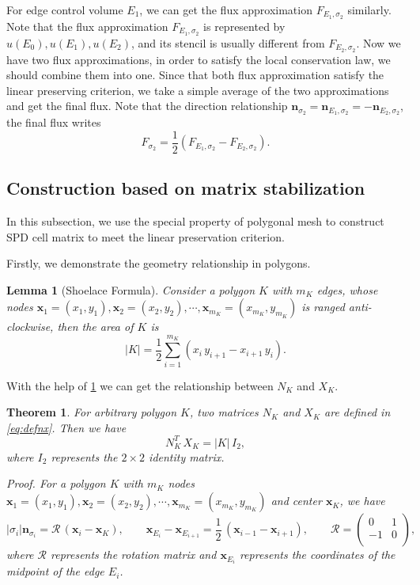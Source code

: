 \documentclass[times,review,preprint,authoryear]{elsarticle}
\newtheorem{theorem}{Theorem}
\newtheorem{lemma}{Lemma}
\newcommand{\bx}{\bm{x}}
\newcommand{\bn}{\bm{n}}
\begin{document}
For edge control volume $E_{1}$, we can get the flux approximation $F_{E_{1}, \sigma_{2}}$ similarly. Note that the flux approximation $F_{E_{1}, \sigma_{2}}$ is represented by $u(E_{0}), u(E_{1}), u(E_{2})$, and its stencil is usually different from $F_{E_{2}, \sigma_{2}}$. Now we have two flux approximations, in order to satisfy the local conservation law, we should combine them into one. Since that both flux approximation satisfy the linear preserving criterion, we take a simple average of the two approximations and get the final flux. Note that the direction relationship $\bn_{\sigma_{2}} = \bn_{E_{1}, \sigma_{2}} = - \bn_{E_{2}, \sigma_{2}}$, the final flux writes
\begin{equation*}
F_{\sigma_{2}} = \frac12 (F_{E_{1}, \sigma_{2}} - F_{E_{2}, \sigma_{2}}).
\end{equation*}

\subsection{Construction based on matrix stabilization}

In this subsection, we use the special property of polygonal mesh to construct SPD cell matrix to meet the linear preservation criterion.

Firstly, we demonstrate the geometry relationship in polygons.
\begin{lemma}[Shoelace Formula]\label{lemma:K}
Consider a polygon $K$ with $m_K$ edges, whose nodes $\bx_1 = (x_1, y_1), \bx_2 = (x_2, y_2), \cdots, \bx_{m_K} = (x_{m_K}, y_{m_K})$ is ranged anti-clockwise, then the area of $K$ is
\begin{equation}
|K| = \frac12 \sum_{i=1}^{m_K} (x_{i} \, y_{i+1} - x_{i+1} \, y_{i}).
\end{equation}
\end{lemma}

With the help of \cref{lemma:K} we can get the relationship between $N_K$ and $X_K$.
\begin{theorem}\label{thm:zhongyao}
For arbitrary polygon $K$, two matrices $N_K$ and $X_K$ are defined in \cref{eq:defnx}. Then we have
\begin{equation}\label{eq:nx}
N_K^T \, X_K = |K| \, I_2,
\end{equation}
where $I_2$ represents the $2 \times 2$ identity matrix.
\end{theorem}

\em{Proof.} For a polygon $K$ with $m_K$ nodes $\bx_1 = (x_1, y_1), \bx_2 = (x_2, y_2), \cdots, \bx_{m_K} = (x_{m_K}, y_{m_K})$ and center $\bx_K$, we have
\begin{equation*}
|\sigma_{i}| \bn_{\sigma_{i}} = \mathcal{R} \, (\bx_{i} - \bx_K), \qquad
\bx_{E_{i}} - \bx_{E_{i+1}} = \frac12 \, (\bx_{i-1} - \bx_{i+1}), \qquad
\mathcal{R} = \left(\begin{matrix}
0 & 1 \\
-1 & 0 \\
\end{matrix}\right),
\end{equation*}
where $\mathcal{R}$ represents the rotation matrix and $\bx_{E_i}$ represents the coordinates of the midpoint of the edge $E_i$.
\end{document}
